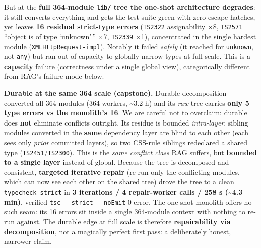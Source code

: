 \documentclass[
  10pt,
]{article}
\begin{document}
But at the \textbf{full 364-module \texttt{lib/} tree the one-shot
architecture degrades}: it still converts everything and gets the test
suite green with zero escape hatches, yet leaves \textbf{16 residual
strict-type errors} (\texttt{TS2322} assignability ×8, \texttt{TS2571}
``object is of type `unknown'\,'' ×7, \texttt{TS2339} ×1), concentrated
in the single hardest module (\texttt{XMLHttpRequest-impl}). Notably it
failed \emph{safely} (it reached for \texttt{unknown}, not \texttt{any})
but ran out of capacity to globally narrow types at full scale. This is
a \textbf{capacity} failure (correctness under a single global view),
categorically different from RAG's failure mode below.

\textbf{Durable at the same 364 scale (capstone).} Durable decomposition
converted all 364 modules (364 workers, \textasciitilde3.2 h) and its
\emph{raw} tree carries \textbf{only 5 type errors vs the monolith's
16}. We are careful not to overclaim: durable does \textbf{not}
eliminate conflicts outright. Its residue is bounded \emph{intra-layer}:
sibling modules converted in the \textbf{same} dependency layer are
blind to each other (each sees only \emph{prior} committed layers), so
two CSS-rule siblings redeclared a shared type
(\texttt{TS2451}/\texttt{TS2300}). This is the \emph{same conflict
class} RAG suffers, but \textbf{bounded to a single layer} instead of
global. Because the tree is decomposed and consistent, \textbf{targeted
iterative repair} (re-run only the conflicting modules, which can now
see each other on the shared tree) drove the tree to a clean
\texttt{typecheck\_strict} in \textbf{3 iterations / 4 repair-worker
calls / 258 s (\textasciitilde4.3 min)}, verified
\texttt{tsc\ -\/-strict\ -\/-noEmit} 0-error. The one-shot monolith
offers no such seam: its 16 errors sit inside a single 364-module
context with nothing to re-run against. The durable edge at full scale
is therefore \textbf{repairability via decomposition}, not a magically
perfect first pass: a deliberately honest, narrower claim.
\end{document}
